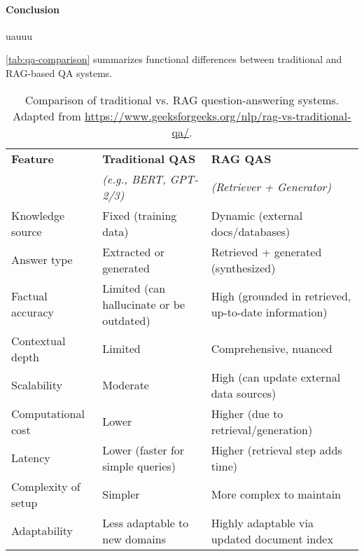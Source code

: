 \begin{spacing}{1.5}
\paragraph{Conclusion}

uauuu

\autoref{tab:qa-comparison} summarizes functional differences between traditional and RAG-based QA systems.

\begin{table}[H]
\centering
\begin{tabularx}{\textwidth}{l>{\raggedright\arraybackslash}X>{\raggedright\arraybackslash}X}
\toprule
\textbf{Feature} & \textbf{Traditional QAS} & \textbf{RAG QAS} \\
& \textit{(e.g., BERT, GPT-2/3)} & \textit{(Retriever + Generator)} \\
\midrule
Knowledge source & Fixed (training data) & Dynamic (external docs/databases) \\
Answer type & Extracted or generated & Retrieved + generated (synthesized) \\
Factual accuracy & Limited (can hallucinate or be outdated) & High (grounded in retrieved, up-to-date information) \\
Contextual depth & Limited & Comprehensive, nuanced \\
Scalability & Moderate & High (can update external data sources) \\
Computational cost & Lower & Higher (due to retrieval/generation) \\
Latency & Lower (faster for simple queries) & Higher (retrieval step adds time) \\
Complexity of setup & Simpler & More complex to maintain \\
Adaptability & Less adaptable to new domains & Highly adaptable via updated document index \\
\bottomrule
\end{tabularx}
\caption{Comparison of traditional vs. RAG question-answering systems.\\ \footnotesize{Adapted from \url{https://www.geeksforgeeks.org/nlp/rag-vs-traditional-qa/}.}}
\label{tab:qa-comparison}
\end{table}

\end{spacing}
